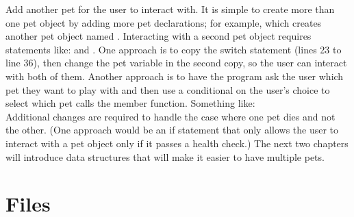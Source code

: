 
Add another pet for the user to interact with. 
It is simple to create more than one pet object by adding more pet declarations; for example,  which creates another pet object named .   
Interacting with a second pet object requires statements like:  and
.  
One approach is to copy the switch statement (lines 23 to line 36), then change the pet variable in the second copy, so the user can interact with both of them.  Another approach is to have the program ask the user which pet they want to play with and then use a conditional on the user's choice to select which pet calls the member function.  Something like:\\
Additional changes are required to handle the case where one pet dies and not the other.  (One approach would be an if statement that only allows the user to interact with a pet object only if it passes a health check.)  The next two chapters will introduce data structures that will make it easier to have multiple pets.

\section{Files}

